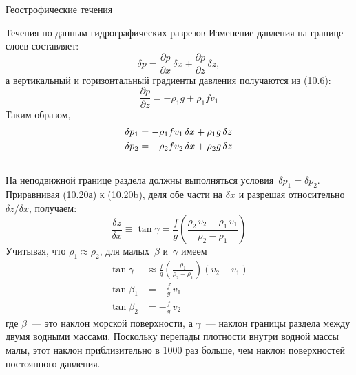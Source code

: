 \begin{chapter}{Геострофические течения}
\begin{section}{Течения по данным гидрографических разрезов}
Изменение давления на границе слоев составляет: 
\begin{equation}
\delta p = \frac{\partial p}{\partial x}\,\delta x 
           + \frac{\partial p}{\partial z}\, \delta z ,
\end{equation}
а вертикальный и горизонтальный градиенты давления получаются 
из (10.6):
\begin{equation}
\frac{\partial p}{\partial z}= - \rho_1 g + \rho_1 f v_1
\end{equation}
Таким образом,
\begin{subequations}
\begin{align}
\delta p_1&=-\rho_1fv_1 \, \delta x + \rho_1 g \, \delta z \\
\delta p_2&=-\rho_2fv_2 \, \delta x + \rho_2 g \, \delta z \\ \notag
\end{align}
\end {subequations}
На неподвижной границе раздела должны выполняться 
условия~$\delta p_1 = \delta p_2$. Приравнивая (10.20а) к (10.20b), 
деля обе части на $\delta x$ и разрешая
относительно $\delta z/\delta x$, получаем:
\begin{displaymath}
\frac{\delta z}{\delta x}\equiv \tan \gamma 
  =\frac{f}{g}\left(\frac{\rho_2\,v_2 - \rho_1\,v_1}{\rho_2 -\rho_1}\right)
\end{displaymath}
Учитывая, что $\rho_1 \approx \rho_2$, для малых~$\beta$ и~$\gamma$ имеем 
\begin{subequations}
\begin{align}
 \tan \gamma &\approx \frac{f}{g}\left(\frac{\rho_1}{\rho_2 - \rho_1}\right)(v_2-v_1) \\
\tan \beta_1&=-\frac{f}{g}\, v_1 \\
\tan \beta_2&=-\frac{f}{g}\, v_2
\end{align}
\end {subequations}
где $\beta$~--- это наклон морской поверхности, а $\gamma$~--- наклон
границы раздела между двумя водными массами. Поскольку перепады
плотности внутри водной массы малы, этот наклон приблизительно в 1000
раз больше, чем наклон поверхностей постоянного давления.
%

\end{section}
\end{chapter}
